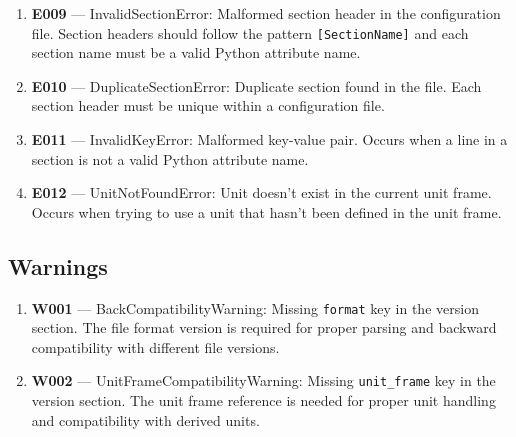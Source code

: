 \documentclass[11pt]{article}
\begin{document}
\begin{enumerate}
  \item \textbf{E009} --- InvalidSectionError: Malformed section header in the configuration file. Section headers should follow the pattern \texttt{[SectionName]} and each section name must be a valid Python attribute name.
  
  \item \textbf{E010} --- DuplicateSectionError: Duplicate section found in the file. Each section header must be unique within a configuration file.
  
  \item \textbf{E011} --- InvalidKeyError: Malformed key-value pair. Occurs when a line in a section is not a valid Python attribute name.
  
  \item \textbf{E012} --- UnitNotFoundError: Unit doesn't exist in the current unit frame. Occurs when trying to use a unit that hasn't been defined in the unit frame.
\end{enumerate}

\subsection{Warnings}

\begin{enumerate}
  \item \textbf{W001} --- BackCompatibilityWarning: Missing \texttt{format} key in the version section. The file format version is required for proper parsing and backward compatibility with different file versions.
  
  \item \textbf{W002} --- UnitFrameCompatibilityWarning: Missing \texttt{unit\_frame} key in the version section. The unit frame reference is needed for proper unit handling and compatibility with derived units.
\end{enumerate}
\end{document}
